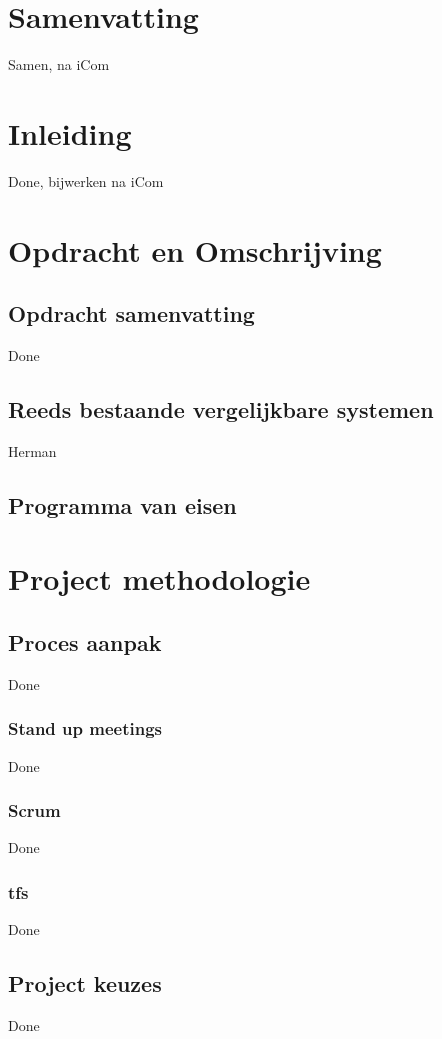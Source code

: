 \chapter{Samenvatting}												Samen, na iCom

\chapter{Inleiding}													Done, bijwerken na iCom

\chapter{Opdracht en Omschrijving} \label{ch:opdracht-en-omschrijving} 
	\section{Opdracht samenvatting}									Done
	\section{Reeds bestaande vergelijkbare systemen}				Herman	
	\section{Programma van eisen} %

\chapter{Project methodologie} \label{ch:project-methodologie} 
	\section{Proces aanpak}											Done
	\subsection{Stand up meetings}									Done
	\subsection{Scrum}												Done
	\subsection{\acl{tfs}}											Done
	\section{Project keuzes}										Done


